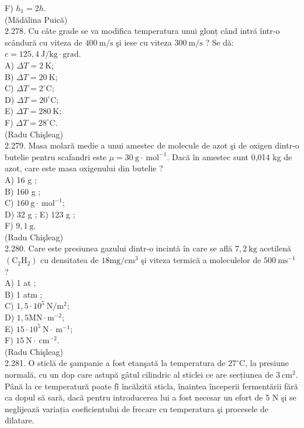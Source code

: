 \documentclass[10pt]{article}
\begin{document}
F) $h_{1}=2 h$.\\
(Mădălina Puică)\\
2.278. Cu câte grade se va modifica temperatura unui glonț când intră într-o scândură cu viteza de $400 \mathrm{~m} / \mathrm{s}$ şi iese cu viteza $300 \mathrm{~m} / \mathrm{s}$ ? Se dă: $c=125,4 \mathrm{~J} / \mathrm{kg} \cdot \mathrm{grad}$.\\
A) $\Delta T=2 \mathrm{~K}$;\\
B) $\Delta T=20 \mathrm{~K}$;\\
C) $\Delta T=2^{\circ} \mathrm{C}$;\\
D) $\Delta T=20^{\circ} \mathrm{C}$;\\
E) $\Delta T=280 \mathrm{~K}$;\\
F) $\Delta T=28^{\circ} \mathrm{C}$.\\
(Radu Chişleag)\\
2.279. Masa molară medie a unui amestec de molecule de azot şi de oxigen dintr-o butelie pentru scafandri este $\mu=30 \mathrm{~g} \cdot \mathrm{~mol}^{-1}$. Dacă în amestec sunt 0,014 kg de azot, care este masa oxigenului din butelie ?\\
A) 16 g ;\\
B) 160 g ;\\
C) $160 \mathrm{~g} \cdot \mathrm{~mol}^{-1}$;\\
D) 32 g ; E) 123 g ;\\
F) $9,1 \mathrm{~g}$.\\
(Radu Chişleag)\\
2.280. Care este presiunea gazului dintr-o incintă în care se află $7,2 \mathrm{~kg}$ acetilenă $\left(\mathrm{C}_{2} \mathrm{H}_{2}\right)$ cu densitatea de $18 \mathrm{mg} / \mathrm{cm}^{3}$ şi viteza termică a moleculelor de $500 \mathrm{~ms}^{-1}$ ?\\
A) 1 at ;\\
B) 1 atm ;\\
C) $1,5 \cdot 10^{5} \mathrm{~N} / \mathrm{m}^{2}$;\\
D) $1,5 \mathrm{MN} \cdot \mathrm{m}^{-2}$;\\
E) $15 \cdot 10^{5} \mathrm{~N} \cdot \mathrm{~m}^{-1}$;\\
F) $15 \mathrm{~N} \cdot \mathrm{~cm}^{-2}$.\\
(Radu Chişleag)\\
2.281. O sticlă de şampanie a fost etanşată la temperatura de $27^{\circ} \mathrm{C}$, la presiune normală, cu un dop care astupă gâtul cilindric al sticlei ce are secțiunea de $3 \mathrm{~cm}^{2}$. Până la ce temperatură poate fî încălzită sticla, înaintea începerii fermentării fără ca dopul să sară, dacă pentru introducerea lui a fost necesar un efort de 5 N şi se neglijează variația coeficientului de frecare cu temperatura şi procesele de dilatare.\\
\end{document}
